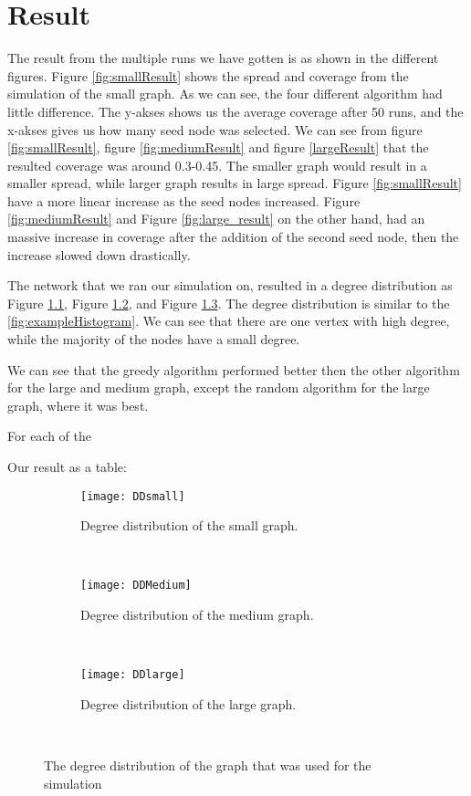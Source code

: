 \chapter{Result}
The result from the multiple runs we have gotten is as shown in the different figures. Figure \ref{fig:smallResult} shows the spread and coverage from the simulation of the small graph. As we can see, the four different algorithm had little difference. The y-akses shows us the average coverage after 50 runs, and the x-akses gives us how many seed node was selected. We can see from figure \ref{fig:smallResult}, figure \ref{fig:mediumResult} and figure \ref{largeResult} that the resulted coverage was around 0.3-0.45. The smaller graph would result in a smaller spread, while larger graph results in large spread. Figure \ref{fig:smallResult} have a more linear increase as the seed nodes increased. Figure \ref{fig:mediumResult} and Figure \ref{fig:large_result} on the other hand, had an massive increase in coverage after the addition of the second seed node, then the increase slowed down drastically. 

The network that we ran our simulation on, resulted in a degree distribution as Figure \ref{fig:smallDegree}, Figure \ref{fig:mediumDegree}, and Figure \ref{fig:largeDegree}. The degree distribution is similar to the \ref{fig:exampleHistogram}. We can see that there are one vertex with high degree, while the majority of the nodes have a small degree. 


We can see that the greedy algorithm performed better then the other algorithm for the large and medium graph, except the random algorithm for the large graph, where it was best.

For each of the  


Our result as a table:

\begin{figure}[h]
\begin{subfigure}{0.3\textwidth}
	\texttt{[image: DDsmall]}
	\caption{Degree distribution of the small graph.}
	\label{fig:smallDegree}
\end{subfigure}
~
\begin{subfigure}{0.3\textwidth}
	\texttt{[image: DDMedium]}
	\caption{Degree distribution of the medium graph.}
	\label{fig:mediumDegree}
\end{subfigure}
~
\begin{subfigure}{0.3\textwidth}
	\texttt{[image: DDlarge]}
	\caption{Degree distribution of the large graph.}
	\label{fig:largeDegree}
\end{subfigure}
~
\caption{The degree distribution of the graph that was used for the simulation}
\label{fig:histogram}
\end{figure}

